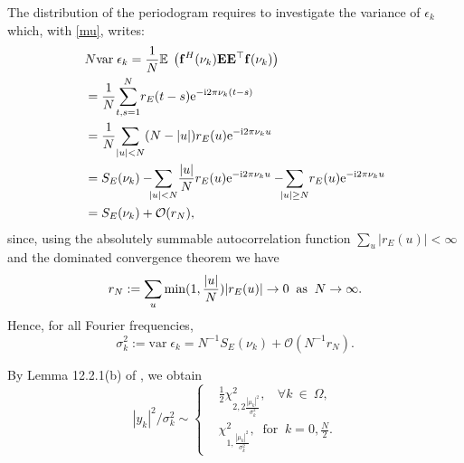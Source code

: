\documentclass[journal]{IEEEtran}
\begin{document}
The distribution of the periodogram requires to investigate the variance of $\epsilon_k$ which, with \eqref{mu}, writes:
$$
      \begin{aligned}
      &N \textrm{var}{\;\epsilon_k}=\frac{1}{N}\mathbb{E}\; \left( {\bf{f}}^H(\nu_k){\bf{E}}{\bf{E}}^\top  {\bf{f}}(\nu_k)\right) \\
	&=\frac{1}{N}\displaystyle{\sum_{t,s=1}^N}r_E(t-s)\mathrm{e}^{-{\rm{i}}2\pi \nu_k(t-s)} \\
	&= \frac{1}{N}\displaystyle{\sum_{|u|<N}}(N-|u|)r_E(u)\mathrm{e}^{-{\rm{i}}2\pi \nu_ku}\\
	&= S_{E}(\nu_k)-\!\!\!\displaystyle{\sum_{|u|<N}}\frac{|u|}{N}r_E(u)\mathrm{e}^{-{\rm{i}}2\pi \nu_ku}
 -\!\!\!\displaystyle{\sum_{|u|\geq N}}r_E(u)\mathrm{e}^{-{\rm{i}}2\pi \nu_ku}\\
	 & =S_{E}(\nu_k) + {\mathcal{O}}(r_N),
   \end{aligned}
$$
since, using { the absolutely summable autocorrelation function $\sum_u |r_E(u)| < \infty$} and the dominated convergence theorem we have
\vspace{-0.4cm}
\begin{equation}
	r_N:=\sum_u \min(1,\frac{|u|}{N}) |r_E(u)| \to 0 \textrm{\;\;as\;\;} N \to \infty.
	\vspace{-0.2cm}
	\label{lerho} 
\end{equation}
Hence, for all Fourier frequencies,
 \begin{equation}
	 \sigma^2_k:= \textrm{var}\;\epsilon_k= N^{-1} S_{E}(\nu_k) + {\mathcal{O}}(N^{-1} r_N).
	 \label{lavar}
 \end{equation}
 
 By Lemma 12.2.1(b) of \cite{Li_2014}, we obtain 
$$
  |y_k|^2/\sigma^2_k \sim   \left\{
      \begin{aligned}
		&{  \frac{1}{2}} \chi^2_{2,2\frac{|\mu_k|^2}{\sigma^2_k}},  ~~~~ \forall k ~ \in ~ \Omega,\\
		&  \chi^2_{1,\frac{|\mu_k|^2}{\sigma^2_k}}, ~ \text{ for } ~ k = 0, \frac{N}{2}.
	 \end{aligned}
	  \right.
$$
\end{document}
